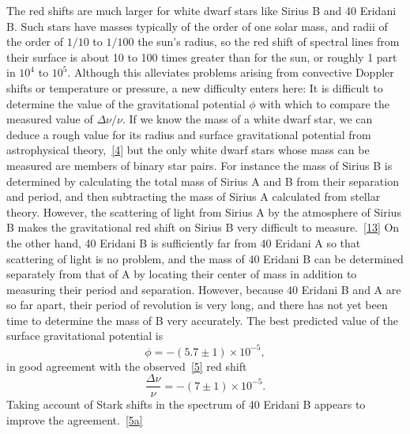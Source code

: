 The red shifts are much larger for white dwarf stars like Sirius B and 40
Eridani B. Such stars have masses typically of the order of one solar mass,
and radii of the order of $1/10$ to $1/100$ the sun's radius, so the red
shift of spectral lines from their surface is about 10 to 100 times greater
than for the sun, or roughly 1 part in $10^4$ to $10^5$. Although this
alleviates problems arising from convective Doppler shifts or temperature or
pressure, a new difficulty enters here: It is difficult to determine the
value of the gravitational potential $\phi$ with which to compare the
measured value of $\Delta\nu/\nu$. If we know the mass of a white dwarf
star, we can deduce a rough value for its radius and surface gravitational
potential from astrophysical theory,~\hyperref[ch3-ref-4]{[4]} but the only
white dwarf stars whose mass can be measured are members of binary star
pairs. For instance the mass of Sirius B is determined by calculating the
total mass of Sirius A and B from their separation and period, and then
subtracting the mass of Sirius A calculated from stellar theory. However,
the scattering of light from Sirius A by the atmosphere of Sirius B makes
the gravitational red shift on Sirius B very difficult to
measure.~\hyperref[ch3-ref-13]{[13]} On the other hand, 40 Eridani B is
sufficiently far from 40 Eridani A so that scattering of light is no
problem, and the mass of 40 Eridani B can be determined separately from that
of A by locating their center of mass in addition to measuring their period
and separation. However, because 40 Eridani B and A are so far apart, their
period of revolution is very long, and there has not yet been time to
determine the mass of B very accurately. The best predicted value of the
surface gravitational potential is
\[
  \phi=-(5.7\pm1)\times10^{-5},
\]
in good agreement with the observed~\hyperref[ch3-ref-5]{[5]} red shift
\[
  \frac{\Delta\nu}{\nu}=-(7\pm1)\times10^{-5}.
\]
Taking account of Stark shifts in the spectrum of 40 Eridani B appears to
improve the agreement.~\hyperref[ch3-ref-5a]{[5a]}

